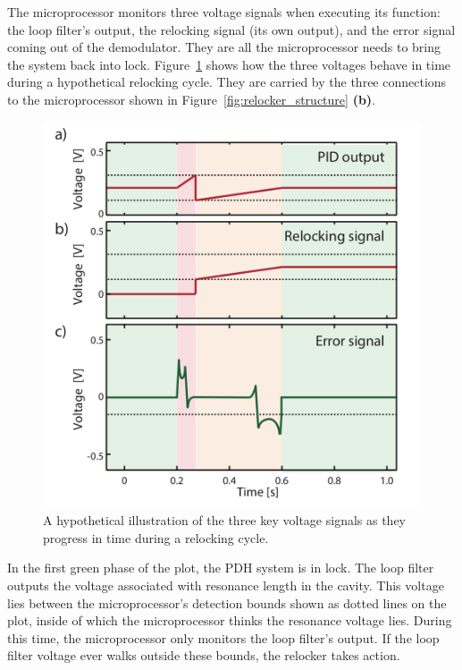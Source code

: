 \documentclass[10pt]{report}
\begin{document}
The microprocessor monitors three voltage signals when executing its function: the loop filter's output, the relocking signal (its own output), and the error signal coming out of the demodulator. They are all the microprocessor needs to bring the system back into lock. Figure~\ref{fig:relocker_cartoon} shows how the three voltages behave in time during a hypothetical relocking cycle. They are carried by the three connections to the microprocessor shown in Figure~\ref{fig:relocker_structure} \textbf{(b)}.

\begin{figure}[h!]
	\includegraphics[scale=.5]{includes/cartoonplots_esig}
	\centering
	\caption{A hypothetical illustration of the three key voltage signals as they progress in time during a relocking cycle.}
	\label{fig:relocker_cartoon}
\end{figure}

In the first green phase of the plot, the PDH system is in lock. The loop filter outputs the voltage associated with resonance length in the cavity. This voltage lies between the microprocessor's detection bounds shown as dotted lines on the plot, inside of which the microprocessor thinks the resonance voltage lies. During this time, the microprocessor only monitors the loop filter's output. If the loop filter voltage ever walks outside these bounds, the relocker takes action.
\end{document}
